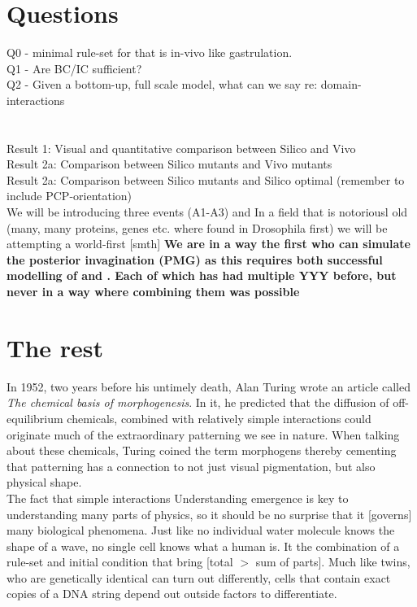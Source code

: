 
\section{Questions}
Q0 - minimal rule-set for that is in-vivo like gastrulation. \\
Q1 - Are BC/IC sufficient?\\
Q2 - Given a bottom-up, full scale model, what can we say re: domain-interactions\\
\\\\
Result 1: Visual and quantitative comparison between Silico and Vivo\\
Result 2a: Comparison between Silico mutants and Vivo mutants\\
Result 2a: Comparison between Silico mutants and Silico optimal (remember to include PCP-orientation)\\




We will be introducing three events (A1-A3) and 
In a field that is notoriousl old (many, many proteins, genes etc. where found in Drosophila first) we will be attempting a world-first [smth]
\textbf{We are in a way the first who can simulate the posterior invagination (PMG)  as this requires both successful modelling of  and . Each of which has had multiple YYY before, but never in a way where combining them was possible}

\section{The rest}
In 1952, two years before his untimely death, Alan Turing wrote an article called \textit{The chemical basis of morphogenesis}.\cite{turing52the} In it, he predicted that the diffusion of off-equilibrium chemicals, combined with relatively simple interactions could originate much of the extraordinary patterning we see in nature. When talking about these chemicals, Turing coined the term morphogens thereby cementing that patterning has a connection to not just visual pigmentation, but also physical shape. \\

The fact that simple interactions 
Understanding emergence is key to understanding many parts of physics, so it should be no surprise that it [governs] many biological phenomena. Just like no individual water molecule knows the shape of a wave, no single cell knows what a human is. It the combination of a rule-set and initial condition that bring [total $>$ sum of parts].
Much like twins, who are genetically identical can turn out differently, cells that contain exact copies of a DNA string depend out outside factors to differentiate. \reph




